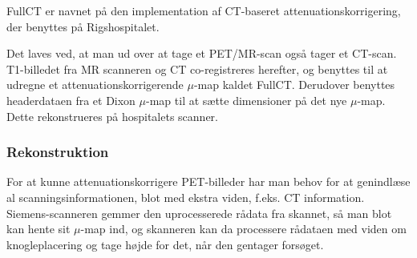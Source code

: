 FullCT er navnet på den implementation af CT-baseret
attenuationskorrigering, der benyttes på Rigshospitalet.

Det laves ved, at man ud over at tage et PET/MR-scan også tager et CT-scan. T1-billedet fra MR scanneren og CT co-registreres herefter, og
benyttes til at udregne et attenuationskorrigerende $\mu$-map kaldet
FullCT. Derudover benyttes headerdataen fra et Dixon $\mu$-map til
at sætte dimensioner på det nye $\mu$-map. Dette rekonstrueres på
hospitalets scanner.

\subsubsection{Rekonstruktion}

For at kunne attenuationskorrigere PET-billeder har man behov for at
genindlæse al scanningsinformationen, blot med ekstra viden, f.eks.
CT information. Siemens-scanneren gemmer den uprocesserede rådata fra
skannet, så man blot kan hente sit $\mu$-map ind, og skanneren kan da
processere rådataen med viden om knogleplacering og tage højde for det,
når den gentager forsøget.

